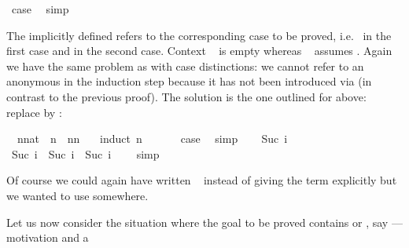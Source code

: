 \begin{isabellebody}
\ {\isacharquery}case\ \isamarkupfalse%
\ simp\isanewline
\isamarkupfalse%
\isamarkupfalse%
%
\begin{isamarkuptext}%
\noindent The implicitly defined  refers to the
corresponding case to be proved, i.e.\  in the first case and
 in the second case. Context ~ is
empty whereas ~ assumes . Again we
have the same problem as with case distinctions: we cannot refer to an anonymous 
in the induction step because it has not been introduced via 
(in contrast to the previous proof). The solution is the one outlined for
 above: replace  by :%
\end{isamarkuptext}%
\isamarkuptrue%
\ \ n{\isacharcolon}{\isacharcolon}nat\ \ {\isachardoublequote}n\ {\isacharless}\ n{\isacharasterisk}n\ {\isacharplus}\ {}{\isachardoublequote}\isanewline
\isamarkupfalse%
\ {\isacharparenleft}induct\ n{\isacharparenright}\isanewline
\ \ \isamarkupfalse%
\ {}\ \isamarkupfalse%
\ {\isacharquery}case\ \isamarkupfalse%
\ simp\isanewline
\isamarkupfalse%
\isanewline
\ \ \isamarkupfalse%
\ {\isacharparenleft}Suc\ i{\isacharparenright}\ \isamarkupfalse%
\ {\isachardoublequote}Suc\ i\ {\isacharless}\ Suc\ i\ {\isacharasterisk}\ Suc\ i\ {\isacharplus}\ {}{\isachardoublequote}\ \isamarkupfalse%
\ simp\isanewline
\isamarkupfalse%
\isamarkupfalse%
%
\begin{isamarkuptext}%
\noindent Of course we could again have written
~ instead of giving the term explicitly
but we wanted to use  somewhere.%
\end{isamarkuptext}%
\isamarkuptrue%
%
\isamarkuptrue%
%
\begin{isamarkuptext}%
Let us now consider the situation where the goal to be proved contains
\isa{{\isasymAnd}} or \isa{{\isasymLongrightarrow}}, say  --- motivation and a

\end{isamarkuptext}
\end{isabellebody}
